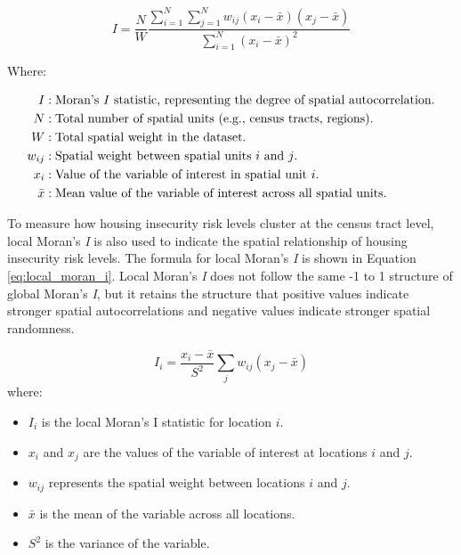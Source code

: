 \begin{equation}\label{eq:moran_i}
    I = \frac{N}{W} \frac{\sum_{i=1}^{N} \sum_{j=1}^{N} w_{ij} (x_i - \bar{x})(x_j - \bar{x})}{\sum_{i=1}^{N} (x_i - \bar{x})^2}
\end{equation}

Where:

\begin{align*}
I & : \text{Moran's \textit{I} statistic, representing the degree of spatial autocorrelation.} \\
N & : \text{Total number of spatial units (e.g., census tracts, regions).} \\
W & : \text{Total spatial weight in the dataset.} \\
w_{ij} & : \text{Spatial weight between spatial units \(i\) and \(j\).} \\
x_i & : \text{Value of the variable of interest in spatial unit \(i\).} \\
\bar{x} & : \text{Mean value of the variable of interest across all spatial units.}
\end{align*}

To measure how housing insecurity risk levels cluster at the census tract level, local Moran's \textit{I} is also used to indicate the spatial relationship of housing insecurity risk levels. The formula for local Moran's \textit{I} is shown in Equation \ref{eq:local_moran_i}. Local Moran's \textit{I} does not follow the same -1 to 1 structure of global Moran's \textit{I}, but it retains the structure that positive values indicate stronger spatial autocorrelations and negative values indicate stronger spatial randomness. 

\begin{equation}\label{eq:local_moran_i}
    I_i = \frac{x_i - \bar{x}}{S^2} \sum_j w_{ij} (x_j - \bar{x})
    \end{equation}
    where:
    \begin{itemize}
        \item \(I_i\) is the local Moran's I statistic for location \(i\).
        \item \(x_i\) and \(x_j\) are the values of the variable of interest at locations \(i\) and \(j\).
        \item \(w_{ij}\) represents the spatial weight between locations \(i\) and \(j\).
        \item \(\bar{x}\) is the mean of the variable across all locations.
        \item \(S^2\) is the variance of the variable.
    \end{itemize}



